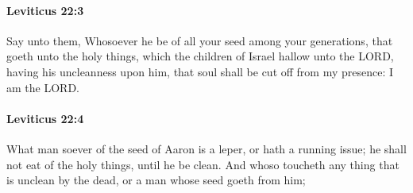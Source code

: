 		\paragraph{Leviticus 22:3} %
			\label{LEVITICUS-22-3}

			Say unto them, Whosoever he be of all your seed among your generations, that goeth unto the holy things, which the children of Israel hallow unto the LORD, having his uncleanness upon him, that soul shall be cut off from my presence: I am the LORD.


		\paragraph{Leviticus 22:4} %
			\label{LEVITICUS-22-4}

			What man soever of the seed of Aaron is a leper, or hath a running issue; he shall not eat of the holy things, until he be clean. And whoso toucheth any thing that is unclean by the dead, or a man whose seed goeth from him;

